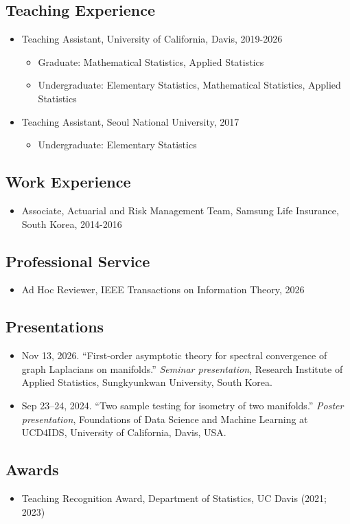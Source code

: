 \documentclass[11pt]{article}
\providecommand{\tightlist}{}
\begin{document}
\subsection*{Teaching Experience}

\begin{itemize}
\tightlist
\item
  Teaching Assistant, University of California, Davis, 2019-2026

  \begin{itemize}
  \tightlist
  \item
    Graduate: Mathematical Statistics, Applied Statistics
  \item
    Undergraduate: Elementary Statistics, Mathematical Statistics,
    Applied Statistics
  \end{itemize}
\item
  Teaching Assistant, Seoul National University, 2017

  \begin{itemize}
  \tightlist
  \item
    Undergraduate: Elementary Statistics
  \end{itemize}
\end{itemize}

\subsection*{Work Experience}

\begin{itemize}
\tightlist
\item
  Associate, Actuarial and Risk Management Team, Samsung Life Insurance,
  South Korea, 2014-2016
\end{itemize}

\subsection*{Professional Service}

\begin{itemize}
\tightlist
\item
  Ad Hoc Reviewer, IEEE Transactions on Information Theory, 2026
\end{itemize}

\subsection*{Presentations}

\begin{itemize}
\item
  Nov 13, 2026. ``First-order asymptotic theory for spectral convergence
  of graph Laplacians on manifolds.'' \emph{Seminar presentation},
  Research Institute of Applied Statistics, Sungkyunkwan University,
  South Korea.
\item
  Sep 23--24, 2024. ``Two sample testing for isometry of two
  manifolds.'' \emph{Poster presentation}, Foundations of Data Science
  and Machine Learning at UCD4IDS, University of California, Davis, USA.
\end{itemize}

\subsection*{Awards}

\begin{itemize}
\tightlist
\item
  Teaching Recognition Award, Department of Statistics, UC Davis (2021;
  2023)
\end{itemize}
\end{document}
